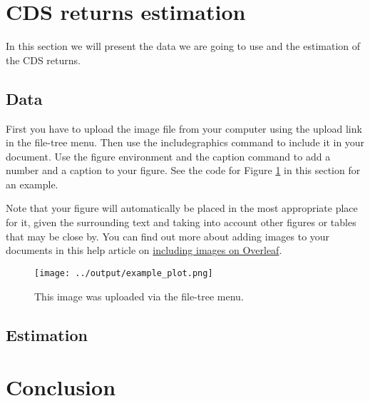 \documentclass{article}
\begin{document}
\begin{Data science tools for finance final project}
\section{CDS returns estimation}
In this section we will present the data we are going to use and the estimation of the CDS returns.

\subsection{Data}




First you have to upload the image file from your computer using the upload link in the file-tree menu. Then use the includegraphics command to include it in your document. Use the figure environment and the caption command to add a number and a caption to your figure. See the code for Figure \ref{fig:myplot} in this section for an example.

Note that your figure will automatically be placed in the most appropriate place for it, given the surrounding text and taking into account other figures or tables that may be close by. You can find out more about adding images to your documents in this help article on \href{https://www.overleaf.com/learn/how-to/Including_images_on_Overleaf}{including images on Overleaf}.

\begin{figure}
\centering
\texttt{[image: ../output/example\_plot.png]}
\caption{\label{fig:myplot}This image was uploaded via the file-tree menu.}
\end{figure}

\subsection{Estimation}



\section{Conclusion}


\end{Data science tools for finance final project}
\end{document}
